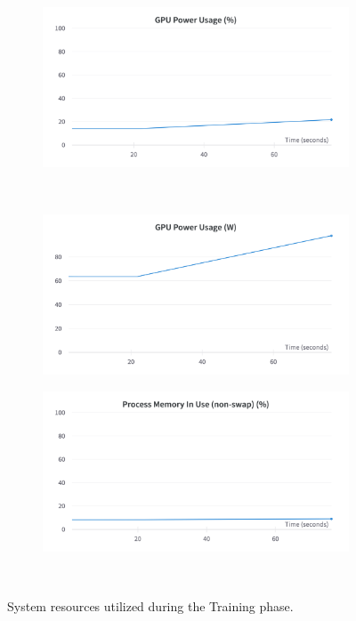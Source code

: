\begin{figure}[]
\begin{subfigure}{0.43\textwidth}
	\end{subfigure}
	\hspace{.5cm}
	\begin{subfigure}{0.43\textwidth}
		\centering
		\includegraphics[width=\textwidth]{chapters/3_models/imgs/ufnc/ufncusageperc.png}
	\end{subfigure}\\
	\begin{subfigure}{0.43\textwidth}
		\centering
		\includegraphics[width=\textwidth]{chapters/3_models/imgs/ufnc/ufncusagew.png}
	\end{subfigure}
	\hspace{.5cm}
	\begin{subfigure}{0.43\textwidth}
		\centering
		\includegraphics[width=\textwidth]{chapters/3_models/imgs/ufnc/ufcnmemram.png}
	\end{subfigure}\\
	\caption{System resources utilized during the Training phase.}
	\label{fig:ufcnsysusage}
\end{figure}

